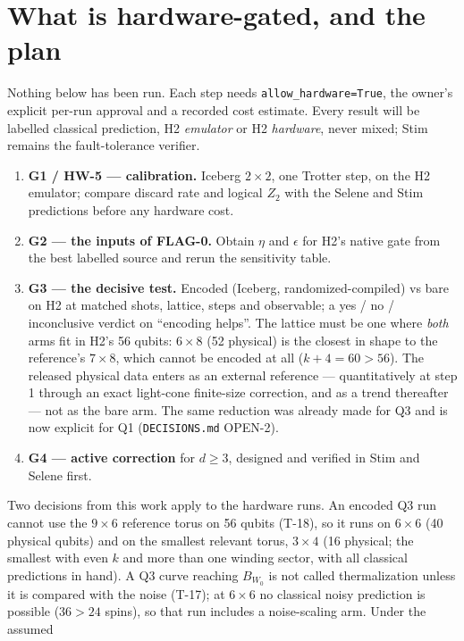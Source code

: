 \documentclass[11pt,a4paper]{article}
\newcommand{\code}[1]{\nolinkurl{#1}}
\begin{document}
\section{What is hardware-gated, and the plan}\label{sec:hw}

Nothing below has been run. Each step needs \code{allow_hardware=True}, the owner's explicit per-run approval
and a recorded cost estimate. Every result will be labelled classical prediction, H2 \emph{emulator} or H2
\emph{hardware}, never mixed; Stim remains the fault-tolerance verifier.
\begin{enumerate}
\item \textbf{G1 / HW-5 --- calibration.} Iceberg $2\times2$, one Trotter step, on the H2 emulator; compare discard
  rate and logical $Z_2$ with the Selene and Stim predictions before any hardware cost.
\item \textbf{G2 --- the inputs of FLAG-0.} Obtain $\eta$ and $\epsilon$ for H2's native gate from the best
  labelled source and rerun the sensitivity table.
\item \textbf{G3 --- the decisive test.} Encoded (Iceberg, randomized-compiled) vs bare on H2 at matched shots,
  lattice, steps and observable; a yes / no / inconclusive verdict on ``encoding helps''. The lattice must be
  one where \emph{both} arms fit in H2's 56 qubits: $6\times8$ (52 physical) is the closest in shape to the
  reference's $7\times8$, which cannot be encoded at all ($k+4=60>56$). The released physical data enters as an
  external reference --- quantitatively at step 1 through an exact light-cone finite-size correction, and as a
  trend thereafter --- not as the bare arm. The same reduction was already made for Q3 and is now explicit
  for Q1 (\texttt{DECISIONS.md} OPEN-2).
\item \textbf{G4 --- active correction} for $d\ge3$, designed and verified in Stim and Selene first.
\end{enumerate}
Two decisions from this work apply to the hardware runs. An encoded Q3 run cannot use the $9\times6$ reference torus on
56 qubits (T-18), so it runs on $6\times6$ (40 physical qubits) and on the smallest relevant torus, $3\times4$
(16 physical; the smallest with even $k$ and more than one winding sector, with all classical predictions in hand).
A Q3 curve reaching $B_{W_0}$ is not called thermalization unless it is compared with the noise (T-17); at $6\times6$
no classical noisy prediction is possible ($36>24$ spins), so that run includes a noise-scaling arm. Under the assumed
\end{document}
